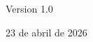\clearpage
\thispagestyle{empty}
\pagestyle{empty}
\vspace*{\fill}
\begin{center}
{\Large Version 1.0\par}
\vspace{0.75\baselineskip}
23 de abril de 2026\par
\end{center}
\vspace*{\fill}
